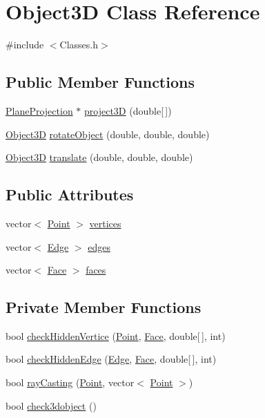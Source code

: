 \hypertarget{class_object3_d}{}\section{Object3D Class Reference}
\label{class_object3_d}


{\ttfamily \#include $<$Classes.\+h$>$}

\subsection*{Public Member Functions}
\begin{DoxyCompactItemize}
\item 
\hyperlink{class_plane_projection}{Plane\+Projection} $\ast$ \hyperlink{class_object3_d_a7767ac8b73a117c8cd8cbdaf7c6f4699}{project3D} (double\mbox{[}$\,$\mbox{]})
\item 
\hyperlink{class_object3_d}{Object3D} \hyperlink{class_object3_d_a476b3de610cb30be0b050b4701ba4701}{rotate\+Object} (double, double, double)
\item 
\hyperlink{class_object3_d}{Object3D} \hyperlink{class_object3_d_afb299c53794e9f4fb708efbde24c9a21}{translate} (double, double, double)
\end{DoxyCompactItemize}
\subsection*{Public Attributes}
\begin{DoxyCompactItemize}
\item 
vector$<$ \hyperlink{class_point}{Point} $>$ \hyperlink{class_object3_d_a225a5c970a1d3d343fc495764ccc3cfd}{vertices}
\item 
vector$<$ \hyperlink{class_edge}{Edge} $>$ \hyperlink{class_object3_d_ad1d85cb131bbc39c772dc5badd0ec1c0}{edges}
\item 
vector$<$ \hyperlink{class_face}{Face} $>$ \hyperlink{class_object3_d_a58677f390d3ba13026e68f4b2a530580}{faces}
\end{DoxyCompactItemize}
\subsection*{Private Member Functions}
\begin{DoxyCompactItemize}
\item 
bool \hyperlink{class_object3_d_a2ec1e4c1198f44794b3c3a1c72f6143d}{check\+Hidden\+Vertice} (\hyperlink{class_point}{Point}, \hyperlink{class_face}{Face}, double\mbox{[}$\,$\mbox{]}, int)
\item 
bool \hyperlink{class_object3_d_a2bc5ce361addc05302a078ada575261d}{check\+Hidden\+Edge} (\hyperlink{class_edge}{Edge}, \hyperlink{class_face}{Face}, double\mbox{[}$\,$\mbox{]}, int)
\item 
bool \hyperlink{class_object3_d_a026c35f9fcf1f58f4d48c18ab26d7712}{ray\+Casting} (\hyperlink{class_point}{Point}, vector$<$ \hyperlink{class_point}{Point} $>$)
\item 
bool \hyperlink{class_object3_d_a37f6e1bb07f45453a09a92b1238006c8}{check3dobject} ()
\end{DoxyCompactItemize}
